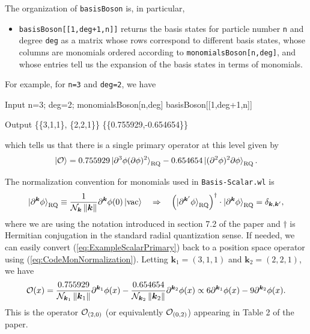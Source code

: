 \documentclass[12pt]{article}
\newcommand{\be}{\begin{eqnarray}}
\newcommand{\ee}{\end{eqnarray}}
\newcommand{\CN}{{\cal N}}
\newcommand{\CO}{{\cal O}}
\newcommand{\p}{\partial}
\newcommand{\bk}{\boldsymbol{k}}
\newcommand{\norm}[1]{\left\lVert#1\right\rVert}
\newcommand{\rket}[1]{\ket{#1}_{\rm RQ}}
\newcommand{\kvec}{\boldsymbol{k}}
\begin{document}
The organization of {\tt basisBoson} is, in particular,
\begin{itemize}
\item {\tt basisBoson[[1,deg+1,n]]} returns the basis states for particle number {\tt n} and degree {\tt deg} as a matrix whose rows correspond to different basis states, whose columns are monomials ordered according to {\tt monomialsBoson[n,deg]}, and whose entries tell us the expansion of the basis states in terms of monomials. 
\end{itemize}
For example, for {\tt n=3} and {\tt deg=2}, we have 
\begin{mmaCell}[moredefined={monomialsBoson,basisBoson}]{Input}
  n=3; deg=2; 
  monomialsBoson[n,deg]
  basisBoson[[1,deg+1,n]]
\end{mmaCell}
\begin{mmaCell}{Output}
  \{\{3,1,1\}, \{2,2,1\}\}
  \{\{0.755929,-0.654654\}\}
\end{mmaCell}
which tells us that there is a single primary operator at this level given by 
\be
\ket{\CO} = 0.755929 \rket{ \p^3 \phi (\p\phi)^2 } -0.654654 \rket{ (\p^2 \phi)^2 \p\phi}  . 
\label{eq:ExampleScalarPrimary}
\ee

The normalization convention for monomials used in {\tt Basis-Scalar.wl} is
\be
\rket{ \p^{\kvec} \phi } \equiv \frac{1}{\CN_{\kvec} \norm{\kvec} } \p^{\kvec}\phi(0) \ket{\rm vac}  \quad  \Rightarrow \quad \left( \rket{\p^{\bk'} \phi} \right)^\dagger \cdot \rket{\p^{\bk} \phi} = \delta_{\bk, \bk'}, 
\label{eq:CodeMonNormalization}
\ee
where we are using the notation introduced in section 7.2 of the paper and $\dagger$ is Hermitian conjugation in the standard radial quantization sense. %
If needed, we can easily convert (\ref{eq:ExampleScalarPrimary}) back to a position space operator using (\ref{eq:CodeMonNormalization}). Letting $\bk_1=(3,1,1)$ and $\bk_2 = (2,2,1)$, we have
\be
\CO(x) = \frac{0.755929}{\CN_{\kvec_1} \norm{\kvec_1}} \p^{\bk_1}\phi(x) - \frac{0.654654}{\CN_{\kvec_2} \norm{\kvec_2}} \p^{\bk_2}\phi(x) \propto  6 \p^{\bk_1}\phi(x) - 9 \p^{\bk_2}\phi(x).
\label{eq:ExamplePositionSpace}
\ee
This is the operator $\CO_{(2,0)}$ (or equivalently $\CO_{(0,2)}$) appearing in Table 2 of the paper. 
\end{document}
